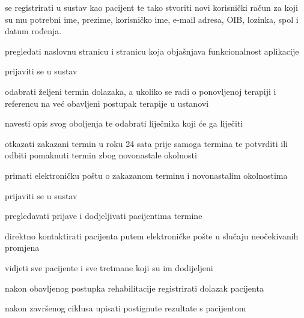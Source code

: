 			
			\begin{packed_enum}
				\item  {}
				
				\begin{packed_enum}
					
					\item se registrirati u sustav kao pacijent te tako stvoriti novi korisnički račun za koji su mu potrebni ime, prezime, korisničko ime, e-mail adresa, OIB, lozinka, spol i datum rođenja.
					\item pregledati naslovnu stranicu i stranicu koja objašnjava funkcionalnost aplikacije
					
					
				\end{packed_enum}
			
				\item  {}
				
				\begin{packed_enum}
					
					\item prijaviti se u sustav
					\item odabrati željeni termin dolazaka, a ukoliko se radi o ponovljenoj terapiji i referencu na već obavljeni postupak terapije u ustanovi
					\item navesti opis svog oboljenja te odabrati liječnika koji će ga liječiti
					\item otkazati zakazani termin u roku 24 sata prije samoga termina te potvrditi ili odbiti pomaknuti termin zbog novonastale okolnosti
					\item primati elektroničku poštu o zakazanom terminu i novonastalim okolnostima
					
				\end{packed_enum}
			
			
			\item  {}
			
			\begin{packed_enum}
				
				\item prijaviti se u sustav
				\item pregledavati prijave i dodjeljivati pacijentima termine
				\item direktno kontaktirati pacijenta putem elektroničke pošte u slučaju neočekivanih promjena
				\item vidjeti sve pacijente i sve tretmane koji su im dodijeljeni
				\item nakon obavljenog postupka rehabilitacije registrirati dolazak pacijenta
				\item nakon završenog ciklusa upisati postignute rezultate s pacijentom
				

\end{packed_enum}
\end{packed_enum}
